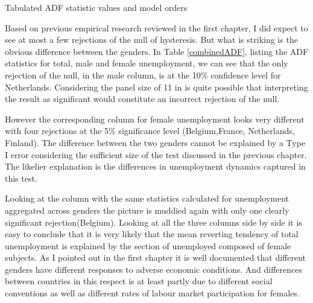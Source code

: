 \documentclass[12pt,a4paper,english]{article}
\begin{document}
\begin{table}[H]\label{combinedADF}
\vspace{1.5cm}
\centering

\caption{Tabulated ADF statistic values and model orders}
\vspace{1.5cm}
\end{table}



%

Based on previous empirical research reviewed in the first chapter, I did expect to see at most a few rejections of the null of hysteresis. But what is striking is the obvious difference between the genders. In Table \ref{combinedADF}, listing the ADF statistics for total, male and female unemployment, we can see that the only rejection of the null, in the male column, is at the 10\% confidence level for Netherlands. Considering the panel size of 11 in is quite possible that interpreting the result as significant would constitute an incorrect rejection of the null.

%

However the corresponding column for female unemployment looks very different with four rejections at the 5\% significance level (Belgium,France, Netherlands, Finland). The difference between the two genders cannot be explained by a Type I error considering the sufficient size of the test discussed in the previous chapter. The likelier explanation is the differences in unemployment dynamics captured in this test.

%

Looking at the column with the same statistics calculated for unemployment aggregated across genders the picture is muddied again with only one clearly significant rejection(Belgium). Looking at all the three columns side by side it is easy to conclude that it is very likely that the mean reverting tendency of total unemployment is explained by the section of unemployed composed of female subjects. As I pointed out in the first chapter it is well documented that different genders have different responses to adverse economic conditions. And differences between countries in this respect is at least partly due to different social conventions as well as different rates of labour market participation for females.
\end{document}
